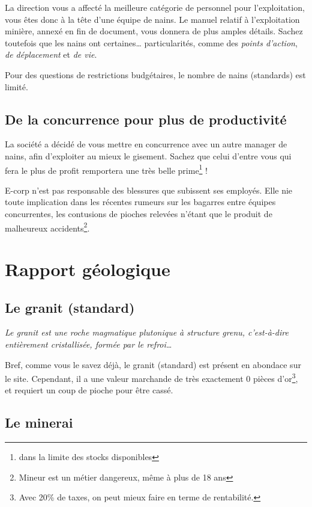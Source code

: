   La direction vous a affecté la meilleure catégorie de personnel pour
  l'exploitation, vous êtes donc à la tête d'une équipe de nains. Le manuel
  relatif à l'exploitation minière, annexé en fin de document, vous donnera de
  plus amples détails. Sachez toutefois que les nains ont certaines\ldots{}
  particularités, comme des \textit{points d'action}, \textit{de déplacement}
  et \textit{de vie}.

  Pour des questions de restrictions budgétaires, le nombre de nains
  (standards) est limité.

\subsection{De la concurrence pour plus de productivité}

  La société a décidé de vous mettre en concurrence avec un autre manager de
  nains, afin d'exploiter au mieux le gisement. Sachez que celui d'entre vous
  qui fera le plus de profit remportera une très belle prime\footnote{dans la
  limite des stocks disponibles} !

  E-corp n'est pas responsable des blessures que subissent ses employés. Elle
  nie toute implication dans les récentes rumeurs sur les bagarres entre
  équipes concurrentes, les contusions de pioches relevées n'étant que le
  produit de malheureux accidents\footnote{Mineur est un métier dangereux,
  même à plus de 18 ans}.

\newpage

\section{Rapport géologique}

\subsection{Le granit (standard)}

  \textit{Le granit est une roche magmatique plutonique à structure grenu,
  c'est-à-dire entièrement cristallisée, formée par le refroi\ldots{}}

  Bref, comme vous le savez déjà, le granit (standard) est présent en abondace
  sur le site. Cependant, il a une valeur marchande de très exactement 0 pièces
  d'or\footnote{Avec 20\% de taxes, on peut mieux faire en terme de
  rentabilité.}, et requiert un coup de pioche pour être cassé.

\subsection{Le minerai}

